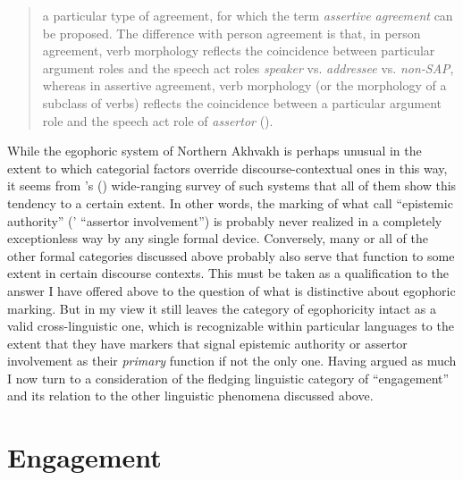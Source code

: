 \documentclass[output=paper]{langsci/langscibook}
\begin{document}
\begin{quote}
	a particular type of agreement, for which the term \textit{assertive agreement} can be proposed. The difference with person agreement is that, in person agreement, verb morphology reflects the coincidence between particular argument roles and the speech act roles \textit{speaker} vs. \textit{addressee} vs. \textit{non-SAP}, whereas in assertive agreement, verb morphology (or the morphology of a subclass of verbs) reflects the coincidence between a particular argument role and the speech act role of \textit{assertor} (\citealt[11]{Creissels2008}).
\end{quote}

While the egophoric system of Northern Akhvakh is perhaps unusual in the extent to which categorial factors override discourse-contextual ones in this way, it seems from \citeauthor{SanRoqueSchieffelin2018}’s (\citeyear{SanRoqueSchieffelin2018}) wide-ranging survey of such systems that all of them show this tendency to a certain extent. In other words, the marking of what \citeauthor{SanRoqueSchieffelin2018} call “epistemic authority” (\citeauthor{Creissels2008}’ “assertor involvement”) is probably never realized in a completely exceptionless way by any single formal device. Conversely, many or all of the other formal categories discussed above probably also serve that function to some extent in certain discourse contexts. This must be taken as a qualification to the answer I have offered above to the question of what is distinctive about egophoric marking. But in my view it still leaves the category of egophoricity intact as a valid cross-linguistic one, which is recognizable within particular languages to the extent that they have markers that signal epistemic authority or assertor involvement as their \textit{primary} function if not the only one. Having argued as much I now turn to a consideration of the fledging linguistic category of “engagement” and its relation to the other linguistic phenomena discussed above.


\section{Engagement}\label{s:ar7}
\end{document}

